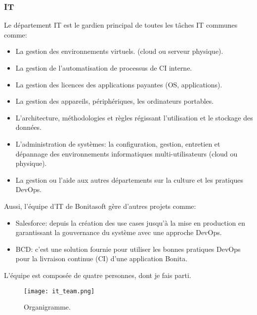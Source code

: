 \subsubsection{IT}
Le département IT est le gardien principal de toutes les tâches IT communes comme:
\begin{itemize}
  \item La gestion des environnements virtuels. (cloud ou serveur physique).
  \item La gestion de l'automatisation de processus de CI interne.
  \item La gestion des licences des applications payantes (OS, applications).
  \item La gestion des appareils, périphériques, les ordinateurs portables.
  \item L'architecture, méthodologies et règles régissant l'utilisation et le stockage des données.
  \item L'administration de systèmes: la configuration, gestion, entretien et dépannage des environnements
  informatiques multi-utilisateurs (cloud ou physique).
  \item  La gestion ou l'aide aux autres départements sur la culture et les pratiques DevOps.
\end{itemize}

Aussi, l'équipe d'IT de Bonitasoft gère d'autres projets comme:
\begin{itemize}
  \item Salesforce: depuis la création des use cases jusqu'à la mise en production en garantissant la gouvernance du système avec une approche DevOps.
  \item BCD: c'est une solution fournie pour utiliser les bonnes pratiques DevOps pour la livraison continue (CI) d'une application Bonita.
\end{itemize}

L'équipe est composée de quatre personnes, dont je fais parti.

\begin{figure}[h]
  \texttt{[image: it\_team.png]}
   \caption{Organigramme.}
   \label{figure:organigrame}
\end{figure}
